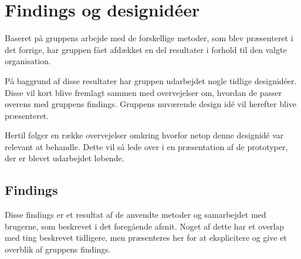 \chapter{Findings og designidéer}
Baseret på gruppens arbejde med de forskellige metoder, som blev præsenteret i det forrige, har gruppen fået afdækket en del resultater i forhold til den valgte organisation. 

På baggrund af disse resultater har gruppen udarbejdet nogle tidlige designidéer. Disse vil kort blive fremlagt sammen med overvejelser om, hvordan de passer overens med gruppens findings. 
Gruppens nuværende design idé vil herefter blive præsenteret. 

Hertil følger en række overvejelser omkring hvorfor netop denne designidé var relevant at behandle. Dette vil så lede over i en præsentation af de prototyper, der er blevet udarbejdet løbende.

\section{Findings}
Disse findings er et resultat af de anvendte metoder og samarbejdet med brugerne, som beskrevet i det foregående afsnit. Noget af dette har et overlap med ting beskrevet tidligere, men præsenteres her for at eksplicitere og give et overblik af gruppens findings.

